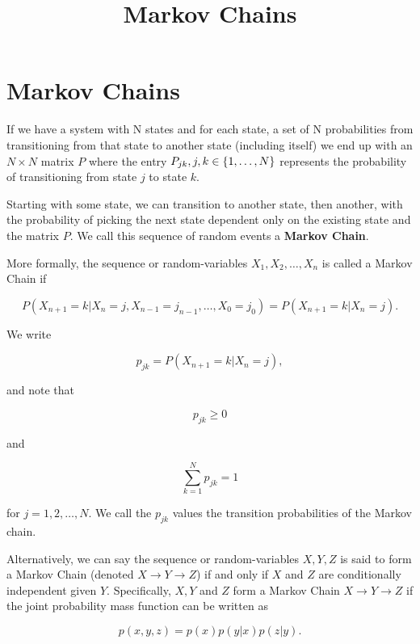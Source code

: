 \documentclass{article}
\title{Markov Chains}
\begin{document}
\section{Markov Chains}

\begin{definition}
If we have a system with N states and for each state, a set of N \@{probabilities} from transitioning from that state to another state (including itself) we end up with an $N \times N$ \@{matrix} $P$ where the \@{entry} $P_{jk}, j,k \in \left\{ 1, \dots, N \right\}$ represents the probability of transitioning from state $j$ to state $k$.

Starting with some state, we can transition to another state, then another, with the probability of picking the next state dependent only on the existing state and the matrix $P.$ We call this sequence of random events a \textbf{Markov Chain}.

	More formally, the \@{sequence} or \@{random-variables}  $X_1, X_2, \dots, X_n$ is called a Markov Chain if

\[ P(X_{n+1} = k|X_n = j, X_{n-1} = j_{n-1}, \dots, X_0 = j_0) = P(X_{n+1} = k | X_n = j). \]

We write

\[ p_{jk} = P(X_{n+1} = k | X_n = j), \]

and note that

\[ p_{jk} \geq 0 \]

and

\[ \sum_{k=1}^{N} p_{jk} =  1 \]

for $j = 1,2, \dots, N.$ We call the $p_{jk}$ values the transition probabilities of the Markov chain.

	Alternatively, we can say the \@{sequence} or \@{random-variables}  $X, Y, Z$ is said to form a Markov Chain (denoted $X \to Y \to Z$) if and only if $X$ and $Z$ are \@{conditionally independent} given $Y.$ Specifically, $X, Y$ and $Z$ form a Markov Chain $X \to Y \to Z$ if the \@{joint probability mass function} can be written as

	\[ p(x, y, z) = p(x) p(y|x) p(z|y). \]

\end{definition}
\end{document}
